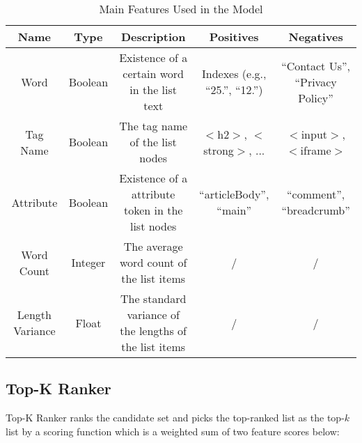\begin{table*}[th]
\centering
\caption{Main Features Used in the Model}
\begin{tabular}{|c||c|c|c|c|}
\hline
Name & Type & Description & Positives & Negatives\\\hline
Word & Boolean & Existence of a certain word in the list text & Indexes (e.g., ``25.'', ``12.'') & ``Contact Us'', ``Privacy Policy''\\
Tag Name & Boolean & The tag name of the list nodes & $<$h2$>$, $<$strong$>$, ... & $<$input$>$,$<$iframe$>$\\
Attribute & Boolean & Existence of a attribute token in the list nodes & ``articleBody'', ``main''& ``comment'', ``breadcrumb''\\
Word Count & Integer & The average word count of the list items& / & / \\
Length Variance & Float & The standard variance of the lengths of the list items & / & / \\
\hline
\end{tabular}
\label{tab:featureType}
\end{table*}

\subsection{Top-K Ranker}
\label{sec:ranker}

Top-K Ranker ranks the candidate set and picks the top-ranked list as the
top-$k$ list by a scoring function which
is a weighted sum of two feature scores below:



